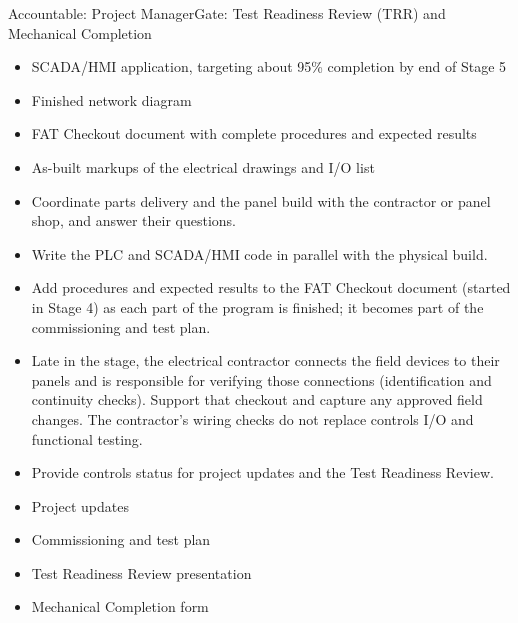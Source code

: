 \begin{stagecard}{Accountable: Project Manager}{Gate: Test Readiness Review (TRR) and Mechanical Completion}
\begin{minipage}[t]{0.485\linewidth}
\begin{itemize}[leftmargin=*,itemsep=1pt,topsep=2pt]
  \item SCADA/HMI application, targeting about 95\% completion by end of Stage 5
  \item Finished network diagram
  \item FAT Checkout document with complete procedures and expected results
  \item As-built markups of the electrical drawings and I/O list
\end{itemize}
\end{minipage}
\tcbline
{}
\begin{itemize}[leftmargin=*,itemsep=1pt,topsep=2pt]
  \item Coordinate parts delivery and the panel build with the contractor or panel shop, and answer their questions.
  \item Write the PLC and SCADA/HMI code in parallel with the physical build.
  \item Add procedures and expected results to the FAT Checkout document (started in Stage 4) as each part of the program is finished; it becomes part of the commissioning and test plan.
  \item Late in the stage, the electrical contractor connects the field devices to their panels and is responsible for verifying those connections (identification and continuity checks). Support that checkout and capture any approved field changes. The contractor's wiring checks do not replace controls I/O and functional testing.
  \item Provide controls status for project updates and the Test Readiness Review.
\end{itemize}
\tcbline
{}\par
\begin{minipage}[t]{0.485\linewidth}
\begin{itemize}[leftmargin=*,itemsep=1pt,topsep=2pt]
  \item Project updates
  \item Commissioning and test plan
\end{itemize}
\end{minipage}\hfill
\begin{minipage}[t]{0.485\linewidth}
\begin{itemize}[leftmargin=*,itemsep=1pt,topsep=2pt]
  \item Test Readiness Review presentation
  \item Mechanical Completion form
\end{itemize}
\end{minipage}
\tcbline
{}
\end{stagecard}

